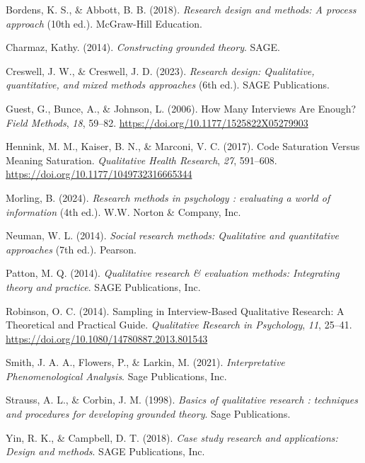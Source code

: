 \documentclass[
  indonesian,
  letterpaper,
  DIV=11,
  numbers=noendperiod]{scrreprt}
\newlength{\cslhangindent}
\newenvironment{CSLReferences}[2] %
 {\begin{list}{}{%
  \setlength{\itemindent}{0pt}
  \setlength{\leftmargin}{0pt}
  \setlength{\parsep}{0pt}
  \ifodd #1
   \setlength{\leftmargin}{\cslhangindent}
   \setlength{\itemindent}{-1\cslhangindent}
  \fi
  \setlength{\itemsep}{#2\baselineskip}}}
 {\end{list}}
\begin{document}
\label{refs--18}
\begin{CSLReferences}{1}{0}
Bordens, K. S., \& Abbott, B. B. (2018). \emph{Research design and
methods: A process approach} (10th ed.). McGraw-Hill Education.

Charmaz, Kathy. (2014). \emph{Constructing grounded theory}. SAGE.

Creswell, J. W., \& Creswell, J. D. (2023). \emph{Research design:
Qualitative, quantitative, and mixed methods approaches} (6th ed.). SAGE
Publications.

Guest, G., Bunce, A., \& Johnson, L. (2006). How Many Interviews Are
Enough? \emph{Field Methods}, \emph{18}, 59--82.
\url{https://doi.org/10.1177/1525822X05279903}

Hennink, M. M., Kaiser, B. N., \& Marconi, V. C. (2017). Code Saturation
Versus Meaning Saturation. \emph{Qualitative Health Research},
\emph{27}, 591--608. \url{https://doi.org/10.1177/1049732316665344}

Morling, B. (2024). \emph{Research methods in psychology : evaluating a
world of information} (4th ed.). W.W. Norton \& Company, Inc.

Neuman, W. L. (2014). \emph{Social research methods: Qualitative and
quantitative approaches} (7th ed.). Pearson.

Patton, M. Q. (2014). \emph{Qualitative research \& evaluation methods:
Integrating theory and practice}. SAGE Publications, Inc.

Robinson, O. C. (2014). Sampling in Interview-Based Qualitative
Research: A Theoretical and Practical Guide. \emph{Qualitative Research
in Psychology}, \emph{11}, 25--41.
\url{https://doi.org/10.1080/14780887.2013.801543}

Smith, J. A. A., Flowers, P., \& Larkin, M. (2021). \emph{Interpretative
Phenomenological Analysis}. Sage Publications, Inc.

Strauss, A. L., \& Corbin, J. M. (1998). \emph{Basics of qualitative
research : techniques and procedures for developing grounded theory}.
Sage Publications.

Yin, R. K., \& Campbell, D. T. (2018). \emph{Case study research and
applications: Design and methods}. SAGE Publications, Inc.

\end{CSLReferences}
\end{document}
